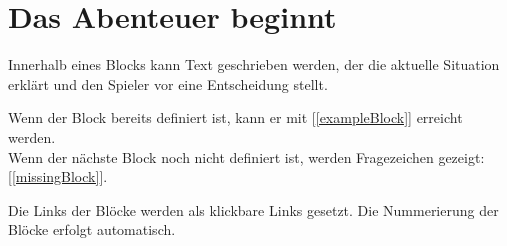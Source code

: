 \chapter*{Das Abenteuer beginnt}


Innerhalb eines Blocks kann Text geschrieben werden, der die aktuelle Situation erklärt und den Spieler vor eine Entscheidung stellt.

Wenn der Block bereits definiert ist, kann er mit [\ref{exampleBlock}] erreicht werden.
\\Wenn der nächste Block noch nicht definiert ist, werden Fragezeichen gezeigt: [\ref{missingBlock}].


Die Links der Blöcke werden als klickbare Links gesetzt. Die Nummerierung der Blöcke erfolgt automatisch.
